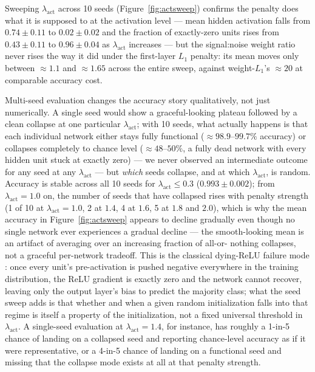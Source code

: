 \documentclass[11pt]{article}
\begin{document}
Sweeping $\lambda_{\mathrm{act}}$ across 10 seeds (Figure~\ref{fig:actsweep})
confirms the penalty does what it is supposed to at the activation level ---
mean hidden activation falls from $0.74\pm0.11$ to $0.02\pm0.02$ and the
fraction of exactly-zero units rises from $0.43\pm0.11$ to $0.96\pm0.04$ as
$\lambda_{\mathrm{act}}$ increases --- but the signal:noise weight ratio
never rises the way it did under the first-layer $L_1$ penalty: its mean
moves only between $\approx 1.1$ and $\approx 1.65$ across the entire
sweep, against weight-$L_1$'s $\approx 20$ at comparable accuracy cost.

Multi-seed evaluation changes the accuracy story qualitatively, not just
numerically. A single seed would show a graceful-looking plateau followed
by a clean collapse at one particular $\lambda_{\mathrm{act}}$; with 10
seeds, what actually happens is that each individual network either stays
fully functional ($\approx 98.9$--$99.7\%$ accuracy) or collapses
completely to chance level ($\approx 48$--$50\%$, a fully dead network
with every hidden unit stuck at exactly zero) --- we never observed an
intermediate outcome for any seed at any $\lambda_{\mathrm{act}}$ --- but
\emph{which} seeds collapse, and at which $\lambda_{\mathrm{act}}$, is
random. Accuracy is stable across all 10 seeds for
$\lambda_{\mathrm{act}}\le0.3$ ($0.993\pm0.002$); from
$\lambda_{\mathrm{act}}=1.0$ on, the number of seeds that have collapsed
rises with penalty strength (1 of 10 at $\lambda_{\mathrm{act}}=1.0$, 2 at
$1.4$, 4 at $1.6$, 5 at $1.8$ and $2.0$), which is why the mean accuracy
in Figure~\ref{fig:actsweep} appears to decline gradually even though no
single network ever experiences a gradual decline --- the smooth-looking
mean is an artifact of averaging over an increasing fraction of all-or-
nothing collapses, not a graceful per-network tradeoff. This is the
classical dying-ReLU failure mode \cite{lu2019dying}: once every unit's
pre-activation is pushed negative everywhere in the training distribution,
the ReLU gradient is exactly zero and the network cannot recover, leaving
only the output layer's bias to predict the majority class; what the
seed sweep adds is that whether and when a given random initialization
falls into that regime is itself a property of the initialization, not a
fixed universal threshold in $\lambda_{\mathrm{act}}$. A single-seed
evaluation at $\lambda_{\mathrm{act}}=1.4$, for instance, has roughly a
1-in-5 chance of landing on a collapsed seed and reporting chance-level
accuracy as if it were representative, or a 4-in-5 chance of landing on a
functional seed and missing that the collapse mode exists at all at that
penalty strength.
\end{document}
